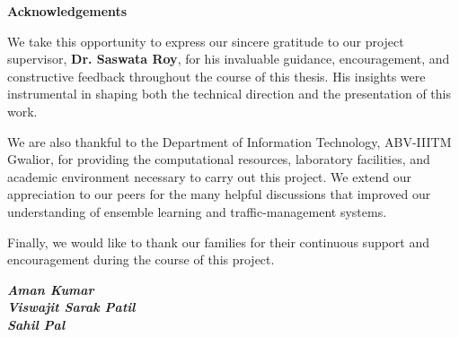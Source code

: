 \begin{center}
{\LARGE \bf Acknowledgements}
\end{center}
\vspace{0.5cm}

\noindent We take this opportunity to express our sincere gratitude to our project supervisor, \textbf{Dr. Saswata Roy}, for his invaluable guidance, encouragement, and constructive feedback throughout the course of this thesis. His insights were instrumental in shaping both the technical direction and the presentation of this work.

\vspace{0.3cm}
\noindent We are also thankful to the Department of Information Technology, ABV-IIITM Gwalior, for providing the computational resources, laboratory facilities, and academic environment necessary to carry out this project. We extend our appreciation to our peers for the many helpful discussions that improved our understanding of ensemble learning and traffic-management systems.

\vspace{0.3cm}
\noindent Finally, we would like to thank our families for their continuous support and encouragement during the course of this project.

\vspace{1cm}
\begin{flushright}
\textit{\textbf{Aman Kumar}}\\
\textit{\textbf{Viswajit Sarak Patil}}\\
\textit{\textbf{Sahil Pal}}
\end{flushright}

